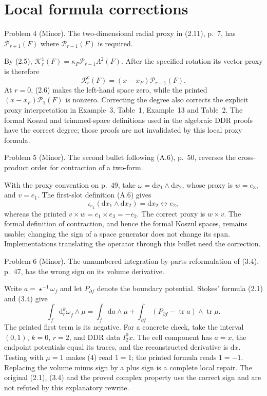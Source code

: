 \documentclass[10pt]{article}
\begin{document}
\section*{Local formula corrections}
Problem 4 (Minor).  The two-dimensional radial proxy in (2.11), p. 7, has \(\mathcal P_{r+1}(F)\) where \(\mathcal P_{r-1}(F)\) is required.\par
By (2.5), \(\mathcal K_r^1(F)=\kappa_F\mathcal P_{r-1}\Lambda^2(F)\). After the specified rotation its vector proxy is therefore \[\mathcal R_r^c(F)=(x-x_F)\mathcal P_{r-1}(F).\] At \(r=0\), (2.6) makes the left-hand space zero, while the printed \((x-x_F)\mathcal P_1(F)\) is nonzero. Correcting the degree also corrects the explicit proxy interpretation in Example 3, Table 1, Example 13 and Table 2. The formal Koszul and trimmed-space definitions used in the algebraic DDR proofs have the correct degree; those proofs are not invalidated by this local proxy formula.\par
Problem 5 (Minor).  The second bullet following (A.6), p. 50, reverses the cross-product order for contraction of a two-form.\par
With the proxy convention on p. 49, take \(\omega=\mathrm dx_1\wedge\mathrm dx_2\), whose proxy is \(w=e_3\), and \(v=e_1\). The first-slot definition (A.6) gives \[\iota_{e_1}(\mathrm dx_1\wedge\mathrm dx_2)=\mathrm dx_2
 \longleftrightarrow e_2,\] whereas the printed \(v\times w=e_1\times e_3=-e_2\). The correct proxy is \(w\times v\). The formal definition of contraction, and hence the formal Koszul spaces, remains usable; changing the sign of a space generator does not change its span. Implementations translating the operator through this bullet need the correction.\par
Problem 6 (Minor).  The unnumbered integration-by-parts reformulation of (3.4), p. 47, has the wrong sign on its volume derivative.\par
Write \(a=\star^{-1}\omega_f\) and let \(P_{\partial f}\) denote the boundary potential. Stokes’ formula (2.1) and (3.4) give \[\int_f\mathrm d_r^k\underline\omega_f\wedge\mu
 =\int_f\mathrm da\wedge\mu+
   \int_{\partial f}(P_{\partial f}-\operatorname{tr}a)\wedge\operatorname{tr}\mu.   \tag{4}\] The printed first term is its negative. For a concrete check, take the interval \((0,1)\), \(k=0\), \(r=2\), and DDR data \(I_2^0x\). The cell component has \(a=x\), the endpoint potentials equal its traces, and the reconstructed derivative is \(\mathrm dx\). Testing with \(\mu=1\) makes (4) read \(1=1\); the printed formula reads \(1=-1\). Replacing the volume minus sign by a plus sign is a complete local repair. The original (2.1), (3.4) and the proved complex property use the correct sign and are not refuted by this explanatory rewrite.\par
\end{document}
